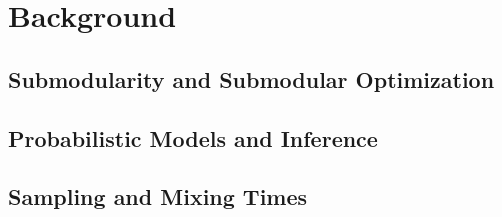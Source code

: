 \chapter{Background} \label{ch:background}

\section{Submodularity and Submodular Optimization}

\section{Probabilistic Models and Inference}

\section{Sampling and Mixing Times}